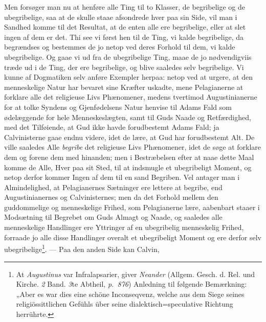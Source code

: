 \documentclass[12pt]{book}
\newcommand{\opage}[1]{\marginnote{\footnotesize\textit{[#1]}}}
\begin{document}
Men forsøger man nu at henføre alle Ting til to Klasser, de begribelige og de
ubegribelige, saa at de skulle staae afsondrede hver paa sin Side, vil man i
Sandhed komme til det Resultat, at de enten alle ere begribelige, eller at slet
\opage{49} \setcounter{footnote}{0}%
ingen af dem er det. Thi see vi først hen til de Ting, vi kalde begribelige, da
begrændses og bestemmes de jo netop ved deres Forhold til dem, vi kalde
ubegribelige. Og gaae vi ud fra de ubegribelige Ting, maae de jo nødvendigviis
træde ud i de Ting, der ere begribelige, og blive saaledes selv begribelige. Vi
kunne af Dogmatiken selv anføre Exempler herpaa: netop ved at urgere, at den
menneskelige Natur har bevaret sine Kræfter uskadte, mene Pelagianerne at
forklare alle det religieuse Livs Phænomener, medens tvertimod Augustinianerne
for at tolke Syndens og Gjenfødelsens Natur henvise til Adams Fald som
ødelæggende for hele Menneskeslægten, samt til Guds Naade og Retfærdighed, med
det Tilføiende, at Gud ikke havde forudbestemt Adams Fald; ja Calvinisterne gaae
endnu videre, idet de lære, at Gud har forudbestemt Alt. De ville saaledes Alle
\emph{begribe} det religieuse Livs Phænomener, idet de søge at forklare dem og
forene dem med hinanden; men i Bestræbelsen efter at naae dette Maal komme de
Alle, Hver paa sit Sted, til at indsmugle et ubegribeligt Moment, og netop derfor
kommer Ingen af dem til en sand Begriben. Vel antager man i Almindelighed, at
Pelagianernes Sætninger ere lettere at begribe, end Augustinianernes og
Calvinisternes; men da det Forhold mellem den guddommelige og menneskelige
Frihed, som Pelagianerne lære, aabenbart staaer i Modsætning til Begrebet om Guds
Almagt og Naade, og saaledes alle menneskelige Handlinger ere Yttringer af en
ubegribelig menneskelig Frihed, forraade jo alle disse Handlinger overalt et
ubegribeligt Moment og ere derfor selv ubegribelige\footnote{At
\emph{Augustinus} var Infralapsarier, giver \emph{Neander} (Allgem. Gesch. d.
Rel. und Kirche. \textit{2} Band. \textit{3}te Abtheil, \textit{p.\ 876})
Anledning til følgende Bemærkning: „Aber es war dies eine schöne Inconseqvenz,
welche aus dem Siege seines religiössittlichen Gefühls über seine
dialektisch=speculative Richtung herrührte.}. --- Paa den anden Side kan Calvin,
\end{document}
